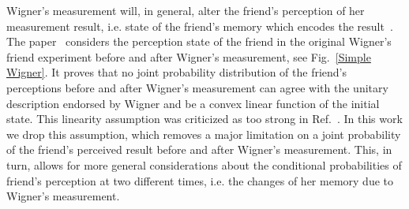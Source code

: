 \documentclass[a4paper,twocolumn,11pt,accepted=2017-05-09,dvipsnames]{quantumarticle}
\numberwithin{equation}{section}
\begin{document}
Wigner's measurement will, in general, alter the friend's perception of her measurement result, i.e. state of the friend's memory which encodes the result~\cite{deutsch1985quantum,baumann2018formalisms,cavalcanti2021view,baumann2020wigner}. The paper~\cite{allard2020no} considers the perception state of the friend in the original Wigner's friend experiment before and after Wigner's measurement, see Fig.~\ref{Simple Wigner}. It proves that no joint probability distribution of the friend's perceptions before and after Wigner's measurement can agree with the unitary description endorsed by Wigner and be a convex linear function of the initial state. 
This linearity assumption was criticized as too strong in Ref.~\cite{schmid2023review}. In this work we drop this assumption, which removes a major limitation on a joint probability of the friend's perceived result before and after Wigner's measurement. This, in turn, allows for more general considerations about the conditional probabilities of friend's perception at two different times, i.e. the changes of her memory due to Wigner's measurement. \\
\end{document}
